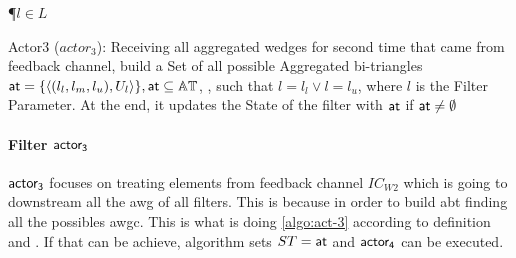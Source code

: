 \begin{algorithm}[h!]
\DontPrintSemicolon
{}
\SetAlgoRefName{[A7]}
\P{$l \in L$}
\FS{$\dwi \subseteq \dw$}
\BlankLine
{}
\PC{$|\ati| \geq 1 \lor \fid$}
\caption[Actor3 ($actor_3$)]{Actor3 ($actor_3$): Receiving all aggregated wedges for second time that came from feedback channel, build a Set of all possible Aggregated bi-triangles $\mathsf{at} = \{\left\langle (l_l, l_m, l_u), U_l \right\rangle\}, \mathsf{at} \subseteq \mathbb{AT}$, , such that $l = l_l \lor l = l_u$, where $l$ is the Filter Parameter. At the end, it updates the State of the filter with $\mathsf{at}$ if $\mathsf{at} \neq \emptyset$}
\label{algo:act-3}
\end{algorithm}

\paragraph{Filter $\mathsf{actor_3}$} $\mathsf{actor_3}$ focuses on treating elements from feedback channel $IC_{W2}$ which is going to downstream all the \acrshort{awg} of all filters.
This is because in order to build \acrshort{abt} finding all the possibles \acrshort{awgc}. This is what is doing \autoref{algo:act-3} according to definition 
 and . If that can be achieve, algorithm sets $ST = \mathsf{at}$ and $\mathsf{actor_4}$ can be executed.

